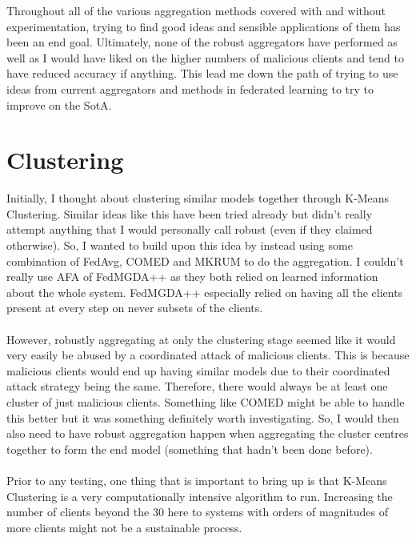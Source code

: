 Throughout all of the various aggregation methods covered with and without experimentation, trying to find good ideas and sensible applications of them has been an end goal.
Ultimately, none of the robust aggregators have performed as well as I would have liked on the higher numbers of malicious clients and tend to have reduced accuracy if anything.
This lead me down the path of trying to use ideas from current aggregators and methods in federated learning to try to improve on the SotA.

\section{Clustering}
Initially, I thought about clustering similar models together through K-Means Clustering.
Similar ideas like this have been tried already \cite{cluster_robagg} but didn't really attempt anything that I would personally call robust (even if they claimed otherwise).
So, I wanted to build upon this idea by instead using some combination of FedAvg, COMED and MKRUM to do the aggregation.
I couldn't really use AFA of FedMGDA++ as they both relied on learned information about the whole system.
FedMGDA++ especially relied on having all the clients present at every step on never subsets of the clients.
\\ \\ 
However, robustly aggregating at only the clustering stage seemed like it would very easily be abused by a coordinated attack of malicious clients.
This is because malicious clients would end up having similar models due to their coordinated attack strategy being the same.
Therefore, there would always be at least one cluster of just malicious clients.
Something like COMED might be able to handle this better but it was something definitely worth investigating.
So, I would then also need to have robust aggregation happen when aggregating the cluster centres together to form the end model (something that hadn't been done before).
\\ \\
Prior to any testing, one thing that is important to bring up is that K-Means Clustering is a very computationally intensive algorithm to run.
Increasing the number of clients beyond the 30 here to systems with orders of magnitudes of more clients might not be a sustainable process.

